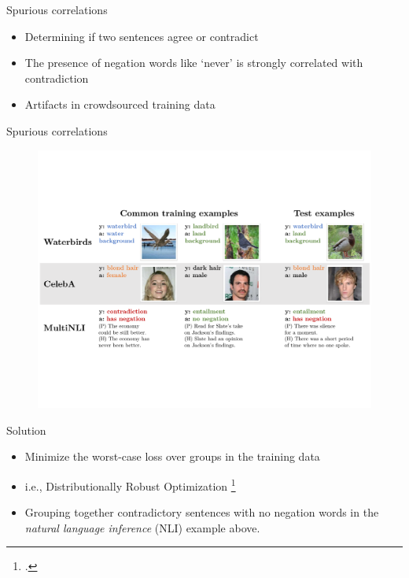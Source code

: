 \documentclass{beamer}
\begin{document}
\begin{viterbiframe}{{\alert{Spurious} correlations}}
    
    \begin{itemize}
        \item Determining if two sentences agree or contradict
        \item The presence of negation words like ‘\alert{never}’ is strongly correlated with contradiction 
        \item Artifacts in crowdsourced training data
    \end{itemize}
    
\end{viterbiframe}

\begin{viterbiframe}{{\alert{Spurious} correlations}}
    \begin{figure}
        \centering
        \includegraphics[width=\textwidth]{img/dataset.pdf}
    \end{figure}
\end{viterbiframe}

\begin{viterbiframe}{Solution}
    \begin{itemize}
        \item Minimize the \alert{worst-case} loss over \alert{groups} in the training data
        \item i.e., Distributionally Robust Optimization \footcite{bental2013robust,oren2019distributionally}
        \item Grouping together \alert{contradictory} sentences with \alert{no negation} words in the \emph{natural language inference} (NLI) example above.
        
    \end{itemize}
\end{viterbiframe}
\end{document}
